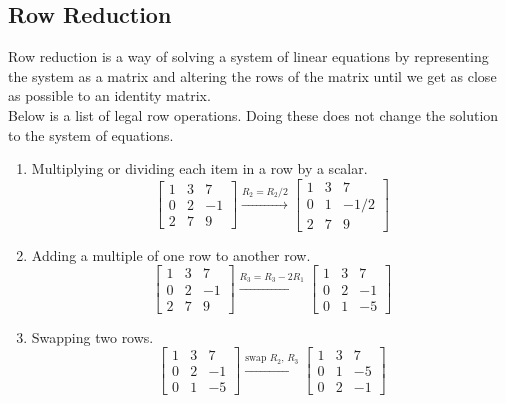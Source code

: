 \subsection{Row Reduction}
\noindent
Row reduction is a way of solving a system of linear equations by representing the system as a matrix and altering the rows of the matrix until we get as close as possible to an identity matrix.\\

\noindent
Below is a list of legal row operations. Doing these does not change the solution to the system of equations.
\begin{enumerate}[label=]
	\item Multiplying or dividing each item in a row by a scalar.
		\begin{equation*}
			\begin{bmatrix}
				1 & 3 & 7 \\
				0 & 2 & -1 \\
				2 & 7 & 9
			\end{bmatrix}
			\stackrel{R_2 = R_2/2}{\to}
			\begin{bmatrix}
				1 & 3 & 7 \\
				0 & 1 & -1/2 \\
				2 & 7 & 9
			\end{bmatrix}
		\end{equation*}
	\item Adding a multiple of one row to another row.
		\begin{equation*}
			\begin{bmatrix}
				1 & 3 & 7 \\
				0 & 2 & -1 \\
				2 & 7 & 9
			\end{bmatrix}
			\stackrel{R_3 = R_3 - 2R_1}{\to}
			\begin{bmatrix}
				1 & 3 & 7 \\
				0 & 2 & -1 \\
				0 & 1 & -5
			\end{bmatrix}
		\end{equation*}
	\item Swapping two rows.
		\begin{equation*}
			\begin{bmatrix}
				1 & 3 & 7 \\
				0 & 2 & -1 \\
				0 & 1 & -5
			\end{bmatrix}
			\stackrel{\text{swap } R_2 \text{, } R_3}{\to}
			\begin{bmatrix}
				1 & 3 & 7 \\
				0 & 1 & -5 \\
				0 & 2 & -1
			\end{bmatrix}
		\end{equation*}
\end{enumerate}

